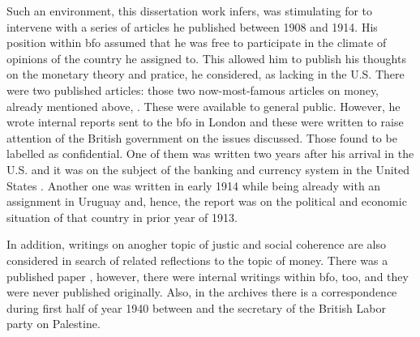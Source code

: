 Such an environment, this dissertation work infers, was stimulating for \citeauthor{innes1913} to intervene with a series of articles he published between 1908 and 1914. His position within \ac{bfo} assumed that he was free to participate in the climate of opinions of the country he assigned to. This allowed him to publish his thoughts on the monetary theory and pratice, he considered, as lacking in the U.S. There were two published articles: those two now-most-famous articles on money, already mentioned above, \citep{innes1913,innes1914}. These were available to general public. However, he wrote internal reports sent to the \ac{bfo} in London and these were written to raise attention of the British government on the issues discussed. Those found to be labelled as confidential. One of them was written two years after his arrival in the U.S. and it was on the subject of the banking and currency system in the United States \citep{innes1910}. Another one was written in early 1914 while being already with an assignment in Uruguay and, hence, the report was on the political and economic situation of that country in prior year of 1913. 

In addition, writings on anogher topic of justic and social coherence are also considered in search of related reflections to the topic of money. There was a published paper \citep{innes1913_}, however, there were internal writings within \ac{bfo}, too, \citep{innes1909, innes1909_} and they were never published originally. Also, in the archives there is a correspondence during first half of year 1940 between \citeauthor{innes1940} and the secretary of the British Labor party on Palestine. 

